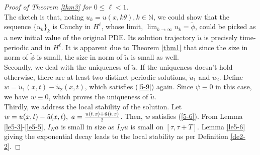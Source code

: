 \documentclass[10pt,a4paper,final]{article}
\numberwithin{equation}{section}
\begin{document}
\begin{proof}[Proof of Theorem \ref{thm3} for $0\le \ell<1$]\ \\
The sketch is that, noting $u_k=u(x, k\theta), k\in \mathbb{N}$, we could show that the sequence $\{u_k\}_k$ is Cauchy in $H^{\ell}$, whose limit, $\displaystyle\lim_{k\rightarrow\infty}u_k = \tilde\phi$, could be picked as a new initial value of the original PDE. Its solution trajectory $\tilde u$ is precisely time-periodic and in $H^{\ell}$. It is apparent due to Theorem \ref{thm1} that since the size in norm of $\tilde\phi$ is small, the size in norm of $\tilde u$ is small as well. \\

Secondly, we deal with the uniqueness of $\tilde u$. If the uniqueness doesn't hold otherwise, there are at least two distinct periodic solutions, $\tilde u_1$ and $\tilde u_2$. Define $w=\tilde u_1(x,t) - \tilde u_2(x,t)$, which satisfies (\ref{5-9}) again. Since $\psi\equiv0$ in this case, we have $w\equiv 0$, which proves the uniqueness of $\tilde u.$\\


Thirdly, we address the local stability of the solution. Let $w = u(x,t)-\tilde u(x,t),\ a={u(t,x)+\tilde u(t, x)\over 2}$. Then, $w$ satisfies (\ref{5-6}). From Lemma \ref{le5-3}-\ref{le5-5}, $I_Na$ is small in size as $I_Nu$ is small on $[\tau, \tau+T]$. Lemma \ref{le5-6} giving the exponential decay leads to the local stability as per Definition \ref{de2-2}.
\end{proof}
\end{document}
